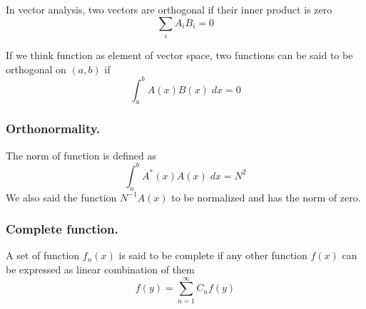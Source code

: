 \documentclass[../main.tex]{subfiles}
\begin{document}
In vector analysis, two vectors are orthogonal if their inner product is zero
\begin{equation*}
	\sum_{i}A_iB_i=0
\end{equation*}

If we think function as element of vector space, two functions can be said to be orthogonal on $(a,b)$ if
\begin{equation*}
	\int_{a}^{b}A(x)B(x)\;dx=0
\end{equation*}

\subsubsection*{Orthonormality.} The norm of function is defined as
\begin{equation*}
	\int_{a}^{b}A^*(x)A(x)\;dx=N^2
\end{equation*}
We also said the function $N^{-1}A(x)$ to be normalized and has the norm of zero.

\subsubsection*{Complete function.} A set of function $f_n(x)$ is said to be complete if any other function $f(x)$ can be expressed as linear combination of them
\begin{equation*}
	f(y)=\sum_{n=1}^{\infty} C_nf(y)
\end{equation*}
\end{document}
